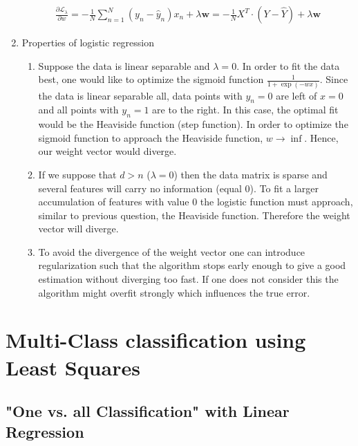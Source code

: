 \documentclass[12pt]{article}
\begin{document}
\begin{enumerate}
\begin{align*}
	\frac{\partial \mathcal{L}_\lambda}{\partial w} = -\frac{1}{N} \sum_{n=1}^{N} \left( y_n - \hat{y}_n \right) x_n + \lambda \textbf{w} = - \frac{1}{N} X^T \cdot \left( Y - \hat{Y} \right) + \lambda \textbf{w}
	\end{align*} 
	\item Properties of logistic regression
	\begin{enumerate}[label=(\alph*)]
		\item Suppose the data is linear separable and $\lambda=0$. In order to fit the data best, one would like to optimize the sigmoid function $\frac{1}{1+\exp(-wx)}$. Since the data is linear separable all, data points with $y_n=0$ are left of $x=0$ and all points with $y_n=1$ are to the right. In this case, the optimal fit would be the Heaviside function (step function). In order to optimize the sigmoid function to approach the Heaviside function, $w\rightarrow \inf$. Hence, our weight vector would diverge. 
		\item If we suppose that $d>n$ ($\lambda=0$) then the data matrix is sparse and several features will carry no information (equal 0). To fit a larger accumulation of features with value 0 the logistic function must approach, similar to previous question, the Heaviside function. Therefore the weight vector will diverge.
		\item To avoid the divergence of the weight vector one can introduce regularization such that the algorithm stops early enough to give a good estimation without diverging too fast. If one does not consider this the algorithm might overfit strongly which influences the true error.
	\end{enumerate}
						
\end{enumerate}

\newpage

\section{Multi-Class classification using Least Squares}

\subsection{"One vs. all Classification" with Linear Regression}
\end{document}
